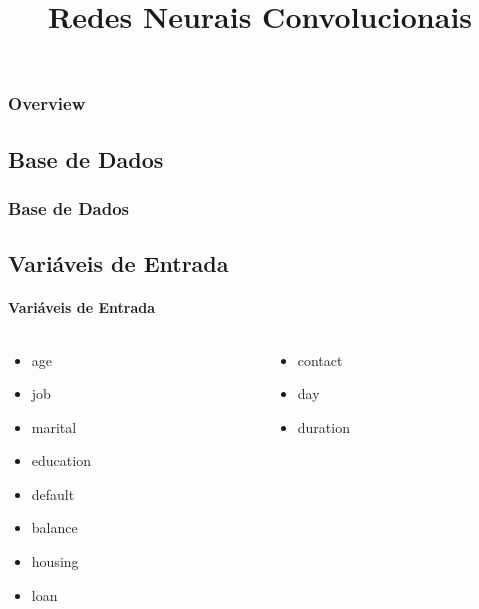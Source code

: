 \documentclass{beamer}
\title{Redes Neurais Convolucionais}
\begin{document}
\maketitle

\begin{frame}[allowframebreaks]
\frametitle{Overview}
\tableofcontents
\end{frame}

\begin{frame}
\section{Base de Dados}
\frametitle{Base de Dados}
\subsection{Variáveis de Entrada}
\framesubtitle{Variáveis de Entrada}

\begin{columns}
    \begin{column}{0.5\textwidth}
        \begin{itemize}
            \item age
        
            \item job
        
            \item marital
        
            \item education
        
            \item default
        
            \item balance 
        
            \item housing
        
            \item loan
        
     
        \end{itemize}
    \end{column}
    \begin{column}{0.5\textwidth}
        \begin{itemize}
            \item contact
            
            \item day 
        
            \item duration
        

\end{itemize}
\end{column}
\end{columns}
\end{frame}
\end{document}
